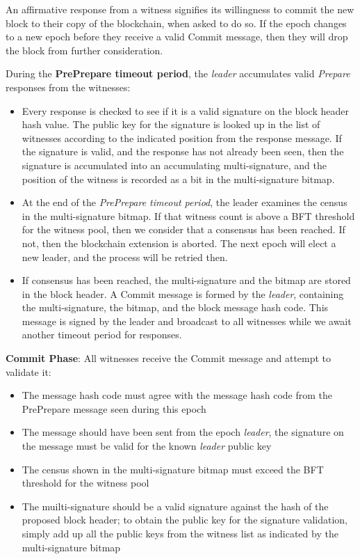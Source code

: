 \documentclass[a4paper, 10pt, conference]{ieeeconf}
\begin{document}
\begin{itemize}
{	\item{An affirmative response from a witness signifies its willingness to commit the new block to their copy of the blockchain, when asked to do so. If the epoch changes to a new epoch before they receive a valid Commit message, then they will drop the block from further consideration.} 

	\item{During the \textbf{PrePrepare timeout period}, the \textit{leader} accumulates valid \textit{Prepare} responses from the witnesses:

		\begin{itemize}
			\item {Every response is checked to see if it is a valid signature on the block header hash value. The public key for the signature is looked up in the list of witnesses according to the indicated position from the response message. If the signature is valid, and the response has not already been seen, then the signature is accumulated into an accumulating multi-signature, and the position of the witness is recorded as a bit in the multi-signature bitmap.} 

			\item {At the end of the \textit{PrePrepare timeout period}, the leader examines the census in the multi-signature bitmap. If that witness count is above a BFT threshold for the witness pool, then we consider that a consensus has been reached. If not, then the blockchain extension is aborted. The next epoch will elect a new leader, and the process will be retried then.}

			\item {If consensus has been reached, the multi-signature and the bitmap are stored in the block header. A Commit message is formed by the \textit{leader}, containing the multi-signature, the bitmap, and the block message hash code. This message is signed by the leader and broadcast to all witnesses while we await another timeout period for responses.}
		\end{itemize}}

	\item {\textbf{Commit Phase}: All witnesses receive the Commit message and attempt to validate it:

		\begin{itemize}
			\item {The message hash code must agree with the message hash code from the PrePrepare message seen during this epoch}
			\item{The message should have been sent from the epoch \textit{leader}, the signature on the message must be valid for the known \textit{leader} public key}
			\item{The census shown in the multi-signature bitmap must exceed the BFT threshold for the witness pool}
			\item{The muilti-signature should be a valid signature against the hash of the proposed block header; to obtain the public key for the signature validation, simply add up all the public keys from the witness list as indicated by the multi-signature bitmap}
		\end{itemize}

}}
\end{itemize}
\end{document}
